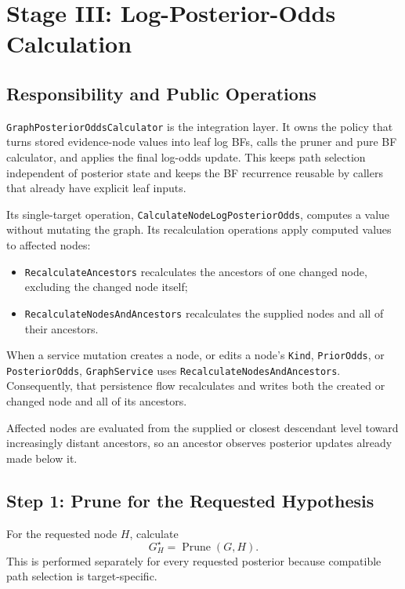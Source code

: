 \documentclass[11pt]{article}
\begin{document}
\section{Stage III: Log-Posterior-Odds Calculation}

\subsection{Responsibility and Public Operations}

\texttt{GraphPosteriorOddsCalculator} is the integration layer.  It owns the
policy that turns stored evidence-node values into leaf log BFs, calls the
pruner and pure BF calculator, and applies the final log-odds update.  This
keeps path selection independent of posterior state and keeps the BF
recurrence reusable by callers that already have explicit leaf inputs.

Its single-target operation,
\texttt{CalculateNodeLogPosteriorOdds}, computes a value without mutating the
graph.  Its recalculation operations apply computed values to affected nodes:

\begin{itemize}
    \item \texttt{RecalculateAncestors} recalculates the ancestors of one
          changed node, excluding the changed node itself;
    \item \texttt{RecalculateNodesAndAncestors} recalculates the supplied
          nodes and all of their ancestors.
\end{itemize}

When a service mutation creates a node, or edits a node's \texttt{Kind},
\texttt{PriorOdds}, or \texttt{PosteriorOdds}, \texttt{GraphService} uses
\texttt{RecalculateNodesAndAncestors}.  Consequently, that persistence flow
recalculates and writes both the created or changed node and all of its
ancestors.

Affected nodes are evaluated from the supplied or closest descendant level
toward increasingly distant ancestors, so an ancestor observes posterior
updates already made below it.

\subsection{Step 1: Prune for the Requested Hypothesis}

For the requested node \(H\), calculate
\[
    G_H^{\star}=\operatorname{Prune}(G,H).
\]
This is performed separately for every requested posterior because compatible
path selection is target-specific.
\end{document}
